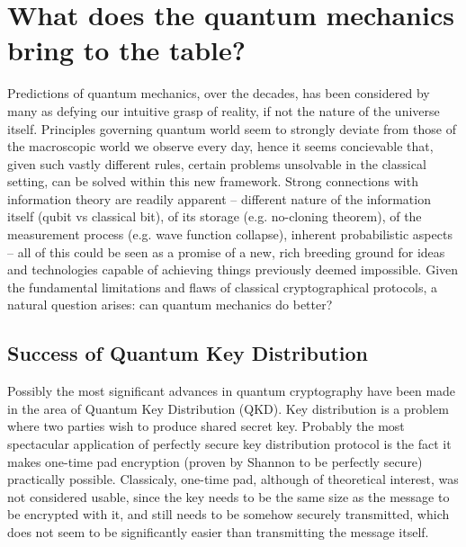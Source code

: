 \documentclass[10pt]{article}
\begin{document}

\section{What does the quantum mechanics bring to the table?}

Predictions of quantum mechanics, over the decades, has been considered by many as defying our intuitive
grasp of reality, if not the nature of the universe itself. Principles governing quantum world seem to
strongly deviate from those of the macroscopic world we observe every day, hence it seems concievable
that, given such vastly different rules, certain problems unsolvable in the classical setting, can be
solved within this new framework. Strong connections with information theory are readily apparent -- 
different nature of the information itself (qubit vs classical bit), of its storage (e.g. no-cloning 
theorem), of the measurement process (e.g. wave function collapse), inherent probabilistic aspects --
all of this could be seen as a promise of a new, rich breeding ground for ideas and technologies
capable of achieving things previously deemed impossible. Given the fundamental limitations and flaws
of classical cryptographical protocols, a natural question arises: can quantum mechanics do better?

\subsection*{Success of Quantum Key Distribution}

Possibly the most significant advances in quantum cryptography have been made in the area of Quantum
Key Distribution (QKD). Key distribution is a problem where two parties wish to produce shared secret
key. Probably the most spectacular application of perfectly secure key distribution protocol is the
fact it makes one-time pad encryption (proven by Shannon to be perfectly secure) practically possible.
Classicaly, one-time pad, although of theoretical interest, was not considered usable, since the
key needs to be the same size as the message to be encrypted with it, and still needs to be somehow 
securely transmitted, which does not seem to be significantly easier than transmitting the message
itself.
\end{document}
